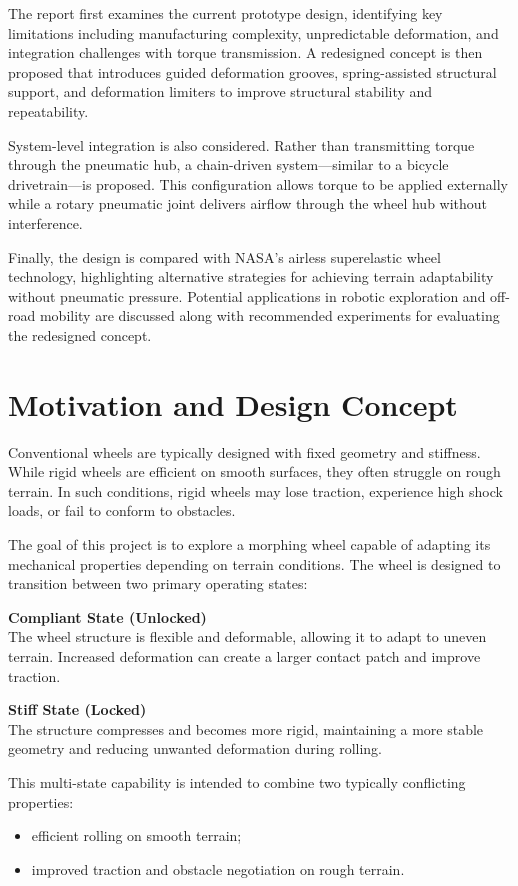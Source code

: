 \documentclass[11pt]{article}
\newcommand{\statebox}[2]{%
  \begin{minipage}[t]{0.47\textwidth}
    \vspace{0pt}
    {\bfseries\color{skkublue}#1}\\[-0.1em]
    #2
  \end{minipage}
}
\begin{document}
The report first examines the current prototype design, identifying key limitations including manufacturing complexity, unpredictable deformation, and integration challenges with torque transmission. A redesigned concept is then proposed that introduces guided deformation grooves, spring-assisted structural support, and deformation limiters to improve structural stability and repeatability.

System-level integration is also considered. Rather than transmitting torque through the pneumatic hub, a chain-driven system---similar to a bicycle drivetrain---is proposed. This configuration allows torque to be applied externally while a rotary pneumatic joint delivers airflow through the wheel hub without interference.

Finally, the design is compared with NASA's airless superelastic wheel technology, highlighting alternative strategies for achieving terrain adaptability without pneumatic pressure. Potential applications in robotic exploration and off-road mobility are discussed along with recommended experiments for evaluating the redesigned concept.

\section{Motivation and Design Concept}
Conventional wheels are typically designed with fixed geometry and stiffness. While rigid wheels are efficient on smooth surfaces, they often struggle on rough terrain. In such conditions, rigid wheels may lose traction, experience high shock loads, or fail to conform to obstacles.

The goal of this project is to explore a morphing wheel capable of adapting its mechanical properties depending on terrain conditions. The wheel is designed to transition between two primary operating states:

\vspace{0.25em}
\statebox{Compliant State (Unlocked)}{The wheel structure is flexible and deformable, allowing it to adapt to uneven terrain. Increased deformation can create a larger contact patch and improve traction.}
\hfill
\statebox{Stiff State (Locked)}{The structure compresses and becomes more rigid, maintaining a more stable geometry and reducing unwanted deformation during rolling.}
\vspace{0.45em}

This multi-state capability is intended to combine two typically conflicting properties:
\begin{itemize}
  \item efficient rolling on smooth terrain;
  \item improved traction and obstacle negotiation on rough terrain.
\end{itemize}
\end{document}

